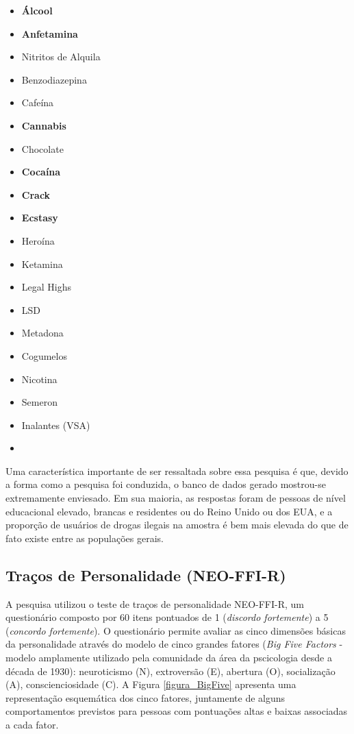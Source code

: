 \documentclass[
	article,			%
	11pt,				%
	oneside,			%
	a4paper,			%
	english,			%
	brazil,				%
	sumario=tradicional
	]{abntex2}
\begin{document}
\begin{multicols}{4}
    \begin{itemize}
        \item \textbf{Álcool}
        \item \textbf{Anfetamina}
        \item Nitritos de Alquila
        \item Benzodiazepina
        \item Cafeína

        \item \textbf{Cannabis}
        \item Chocolate
        \item \textbf{Cocaína}
        \item \textbf{Crack}
        \item \textbf{Ecstasy}

        \item Heroína
        \item Ketamina
        \item Legal Highs
        \item LSD
        \item Metadona
        
        \item Cogumelos
        \item Nicotina
        \item Semeron
        \item Inalantes (VSA)
        \item[]
        
    \end{itemize}
\end{multicols}


Uma característica importante de ser ressaltada sobre essa pesquisa é que, devido a forma como a pesquisa foi conduzida, o banco de dados gerado mostrou-se extremamente enviesado. Em sua maioria, as respostas foram de pessoas de nível educacional elevado, brancas e residentes ou do Reino Unido ou dos EUA, e a proporção de usuários de drogas ilegais na amostra é bem mais elevada do que de fato existe entre as populações gerais.

\subsection{Traços de Personalidade (NEO-FFI-R)} \label{neoffir}

A pesquisa utilizou o teste de traços de personalidade NEO-FFI-R, um questionário composto por 60 itens pontuados de 1 (\emph{discordo fortemente}) a 5 (\emph{concordo fortemente}). O questionário permite avaliar as cinco dimensões básicas da personalidade através do modelo de cinco grandes fatores (\emph{Big Five Factors} - modelo amplamente utilizado pela comunidade da área da pscicologia desde a década de 1930): neuroticismo (N), extroversão (E), abertura (O), socialização (A), conscienciosidade (C). A Figura \ref{figura_BigFive} apresenta uma representação esquemática dos cinco fatores, juntamente de alguns comportamentos previstos para pessoas com pontuações altas e baixas associadas a cada fator.
\end{document}
